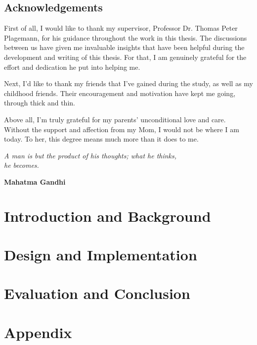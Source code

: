 \documentclass[UKenglish]{ifimaster}  %
\begin{document}
\chapter*{Acknowledgements}
First of all, I would like to thank my supervisor, Professor Dr. Thomas Peter Plagemann, for his guidance throughout the work in this thesis. The discussions between us have given me invaluable insights that have been helpful during the development and writing of this thesis. For that, I am genuinely grateful for the effort and dedication he put into helping me. 

Next, I'd like to thank my friends that I've gained during the study, as well as my childhood friends. Their encouragement and motivation have kept me going, through thick and thin. 

Above all, I'm truly grateful for my parents' unconditional love and care. Without the support and affection from my Mom, I would not be where I am today. To her, this degree means much more than it does to me.

\vspace*{\fill}

\epigraph{\hfill{\textit{A man is but the product of his thoughts; what he thinks, \\he becomes.}}}{\textbf{Mahatma Gandhi}}

\tableofcontents

\listoftables

\listoffigures

\mainmatter{}

\part{Introduction and Background}




\part{Design and Implementation}



\part{Evaluation and Conclusion}





\part*{Appendix}

\appendix{}


\backmatter{}
\printbibliography
\end{document}
